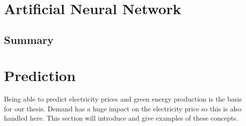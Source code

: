 \documentclass[twoside,11pt,openright]{report}
\begin{document}
\section{Artificial Neural Network}


\subsection{Summary}


\section{Prediction}
Being able to predict electricity prices and green energy production is the basis for our thesis. Demand has a huge impact on the electricity price so this is also handled here. This section will introduce and give examples of these concepts. 
\end{document}
